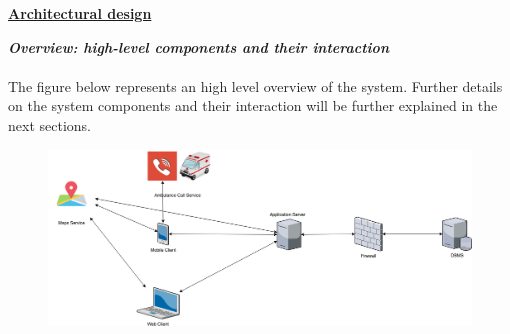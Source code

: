 	\underline{\textbf{Architectural design} }
	\begin{legal}
    	\item \textit{\textbf{Overview: high-level components and their interaction}}\\\\
The figure below represents an high level overview of the system. Further details
on the system components and their interaction will be further explained in the next sections.\\
		\begin{figure}[H]
		\includegraphics[width=\linewidth]{../images/design/OverviewDiagram.png}
		\end{figure}
		

\end{legal}

